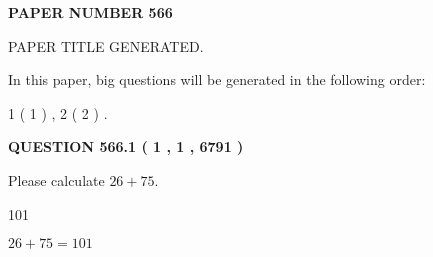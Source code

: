 \documentclass[12pt]{article}
\begin{document}
   
   
   
\newpage 
\setcounter{page}{ 
   566001 } 
   
   
   
   
 {\textbf{ \Large{ PAPER NUMBER  566  }}}
   
   
\vspace{0.2in}
   
   
   
   
   
   
   
   
 \vspace{0.2in}
 
 
 
 
   
   
 PAPER TITLE GENERATED.
   
   
   
\vspace{0.2in}
   
In this paper, big questions will be generated in the following order: 
   
   
   1 ( 1 )
 ,
   2 ( 2 )
 .
  
\vspace{0.2in}
  
{\textbf{\Large{QUESTION
566.1 
 ( 1 , 1 , 6791 )
}}}
  
  
 
Please calculate $ %
26 +  %
75 $.
 
 
 
\noindent{}
 
 

101
 
 
\noindent{}
 
 

 
 
 
\noindent{}
 
 

$ %
26 +  %
75=   %
101$
 
 
\noindent{}
 
 

 
   
   
   
\end{document}
